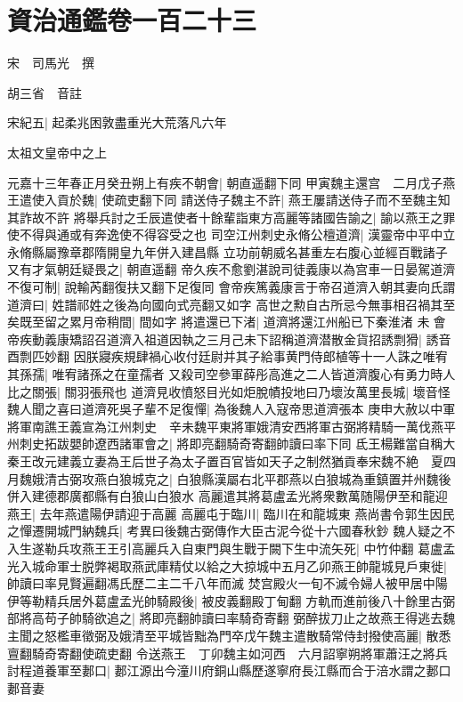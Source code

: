 \chapter{資治通鑑卷一百二十三}
宋　司馬光　撰

胡三省　音註

宋紀五|{
	起柔兆困敦盡重光大荒落凡六年}


太祖文皇帝中之上

元嘉十三年春正月癸丑朔上有疾不朝會|{
	朝直遥翻下同}
甲寅魏主還宫　二月戊子燕王遣使入貢於魏|{
	使疏吏翻下同}
請送侍子魏主不許|{
	燕王屢請送侍子而不至魏主知其詐故不許}
將舉兵討之壬辰遣使者十餘輩詣東方高麗等諸國告諭之|{
	諭以燕王之罪使不得與通或有奔逸使不得容受之也}
司空江州刺史永脩公檀道濟|{
	漢靈帝中平中立永脩縣屬豫章郡隋開皇九年併入建昌縣}
立功前朝威名甚重左右腹心並經百戰諸子又有才氣朝廷疑畏之|{
	朝直遥翻}
帝久疾不愈劉湛說司徒義康以為宫車一日晏駕道濟不復可制|{
	說輸芮翻復扶又翻下足復同}
會帝疾篤義康言于帝召道濟入朝其妻向氏謂道濟曰|{
	姓譜祁姓之後為向國向式亮翻又如字}
高世之勲自古所忌今無事相召禍其至矣既至留之累月帝稍間|{
	間如字}
將遣還已下渚|{
	道濟將還江州船已下秦淮渚}
未會帝疾動義康矯詔召道濟入祖道因執之三月己未下詔稱道濟潜散金貨招誘剽猾|{
	誘音酉剽匹妙翻}
因朕寢疾規肆禍心收付廷尉并其子給事黄門侍郎植等十一人誅之唯宥其孫孺|{
	唯宥諸孫之在童孺者}
又殺司空參軍薛彤高進之二人皆道濟腹心有勇力時人比之關張|{
	關羽張飛也}
道濟見收憤怒目光如炬脫幘投地曰乃壞汝萬里長城|{
	壞音怪}
魏人聞之喜曰道濟死吳子輩不足復憚|{
	為後魏人入寇帝思道濟張本}
庚申大赦以中軍將軍南譙王義宣為江州刺史　辛未魏平東將軍娥清安西將軍古弼將精騎一萬伐燕平州刺史拓跋嬰帥遼西諸軍會之|{
	將即亮翻騎奇寄翻帥讀曰率下同}
氐王楊難當自稱大秦王改元建義立妻為王后世子為太子置百官皆如天子之制然猶貢奉宋魏不絶　夏四月魏娥清古弼攻燕白狼城克之|{
	白狼縣漢屬右北平郡燕以白狼城為重鎮置并州魏後併入建德郡廣都縣有白狼山白狼水}
高麗遣其將葛盧孟光將衆數萬随陽伊至和龍迎燕王|{
	去年燕遣陽伊請迎于高麗}
高麗屯于臨川|{
	臨川在和龍城東}
燕尚書令郭生因民之憚遷開城門納魏兵|{
	考異曰後魏古弼傳作大臣古泥今從十六國春秋鈔}
魏人疑之不入生遂勒兵攻燕王王引高麗兵入自東門與生戰于闕下生中流矢死|{
	中竹仲翻}
葛盧孟光入城命軍士脱弊褐取燕武庫精仗以給之大掠城中五月乙卯燕王帥龍城見戶東徙|{
	帥讀曰率見賢遍翻馮氏歷二主二千八年而滅}
焚宫殿火一旬不滅令婦人被甲居中陽伊等勒精兵居外葛盧孟光帥騎殿後|{
	被皮義翻殿丁甸翻}
方軌而進前後八十餘里古弼部將高苟子帥騎欲追之|{
	將即亮翻帥讀曰率騎奇寄翻}
弼醉拔刀止之故燕王得逃去魏主聞之怒檻車徵弼及娥清至平城皆黜為門卒戊午魏主遣散騎常侍封撥使高麗|{
	散悉亶翻騎奇寄翻使疏吏翻}
令送燕王　丁卯魏主如河西　六月詔寧朔將軍蕭汪之將兵討程道養軍至郪口|{
	郪江源出今潼川府銅山縣歷遂寧府長江縣而合于涪水謂之郪口郪音妻}
